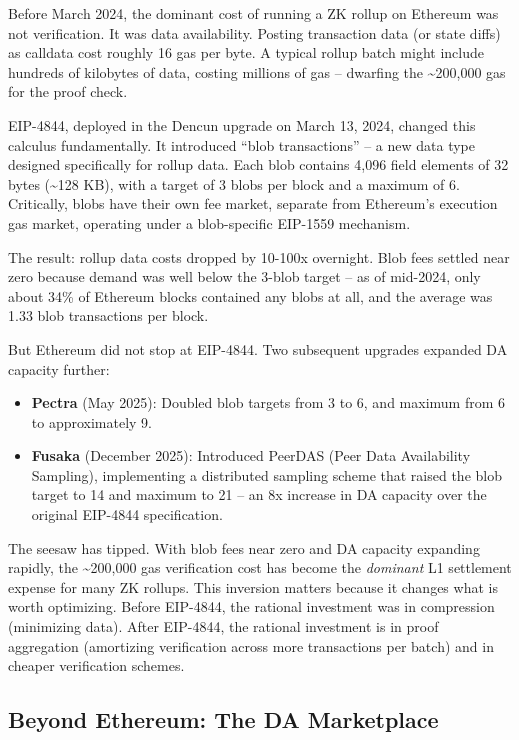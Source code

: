 \documentclass[
  11pt,
  openany]{report}
\providecommand{\tightlist}{%
  \setlength{\itemsep}{0pt}\setlength{\parskip}{0pt}}
\renewcommand{\textbf}[1]{{\bfseries\color{MidnightBold}#1}}
\begin{document}
Before March 2024, the dominant cost of running a ZK rollup on Ethereum was not
verification. It was data availability. Posting transaction data (or state
diffs) as calldata cost roughly 16 gas per byte. A typical rollup batch might
include hundreds of kilobytes of data, costing millions of gas -- dwarfing the
\textasciitilde200,000 gas for the proof check.

EIP-4844, deployed in the Dencun upgrade on March 13, 2024, changed this
calculus fundamentally. It introduced ``blob transactions'' -- a new data type
designed specifically for rollup data. Each blob contains 4,096 field elements
of 32 bytes (\textasciitilde128 KB), with a target of 3 blobs per block and a
maximum of 6. Critically, blobs have their own fee market, separate from
Ethereum's execution gas market, operating under a blob-specific EIP-1559
mechanism.

The result: rollup data costs dropped by 10-100x overnight. Blob fees settled
near zero because demand was well below the 3-blob target -- as of mid-2024,
only about 34\% of Ethereum blocks contained any blobs at all, and the average
was 1.33 blob transactions per block.

But Ethereum did not stop at EIP-4844. Two subsequent upgrades expanded DA
capacity further:

\begin{itemize}
\tightlist
\item
  \textbf{Pectra} (May 2025): Doubled blob targets from 3 to 6, and maximum from
  6 to approximately 9.
\item
  \textbf{Fusaka} (December 2025): Introduced PeerDAS (Peer Data Availability
  Sampling), implementing a distributed sampling scheme that raised the blob
  target to 14 and maximum to 21 -- an 8x increase in DA capacity over the
  original EIP-4844 specification.
\end{itemize}

The seesaw has tipped. With blob fees near zero and DA capacity expanding
rapidly, the \textasciitilde200,000 gas verification cost has become the
\emph{dominant} L1 settlement expense for many ZK rollups. This inversion
matters because it changes what is worth optimizing. Before EIP-4844, the
rational investment was in compression (minimizing data). After EIP-4844, the
rational investment is in proof aggregation (amortizing verification across more
transactions per batch) and in cheaper verification schemes.

\subsection{Beyond Ethereum: The DA
Marketplace}\label{beyond-ethereum-the-da-marketplace}
\end{document}
